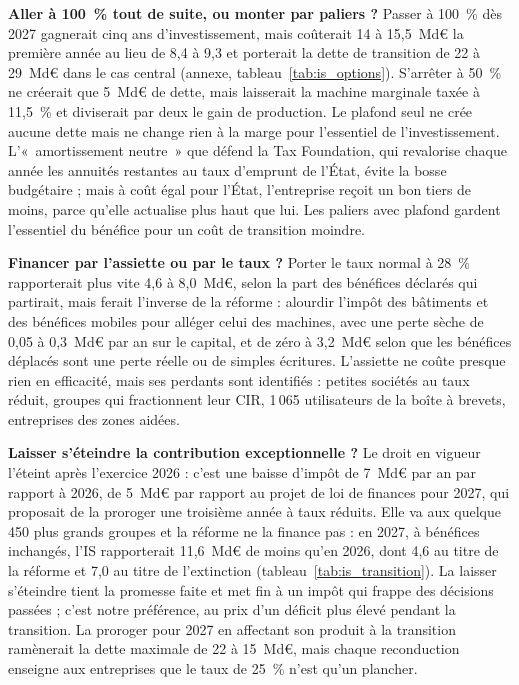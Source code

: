 \textbf{Aller à 100~\% tout de suite, ou monter par paliers ?} Passer à 100~\% dès 2027 gagnerait cinq ans
d'investissement, mais coûterait 14 à 15,5~Md€ la première année au lieu de 8,4 à 9,3 et porterait la dette de
transition de 22 à 29~Md€ dans le cas central (annexe, tableau~\ref{tab:is_options}). S'arrêter à 50~\% ne créerait que
5~Md€ de dette, mais laisserait la machine marginale taxée à 11,5~\% et diviserait par deux le gain de production. Le
plafond seul ne crée aucune dette mais ne change rien à la marge pour l'essentiel de l'investissement. L'«~amortissement
neutre~» que défend la Tax Foundation, qui revalorise chaque année les annuités restantes au taux d'emprunt de l'État,
évite la bosse budgétaire ; mais à coût égal pour l'État, l'entreprise reçoit un bon tiers de moins, parce qu'elle
actualise plus haut que lui. Les paliers avec plafond gardent l'essentiel du bénéfice pour un coût de transition
moindre.

\textbf{Financer par l'assiette ou par le taux ?} Porter le taux normal à 28~\% rapporterait plus vite 4,6 à 8,0~Md€,
selon la part des bénéfices déclarés qui partirait, mais ferait l'inverse de la réforme : alourdir l'impôt des
bâtiments et des bénéfices mobiles pour alléger celui des machines, avec une perte sèche de 0,05 à 0,3~Md€ par an sur
le capital, et de zéro à 3,2~Md€ selon que les bénéfices déplacés sont une perte réelle ou de simples écritures.
L'assiette ne coûte presque rien en efficacité, mais ses perdants sont identifiés : petites sociétés au taux réduit,
groupes qui fractionnent leur CIR, 1\,065 utilisateurs de la boîte à brevets, entreprises des zones aidées.

\textbf{Laisser s'éteindre la contribution exceptionnelle ?} Le droit en vigueur l'éteint après l'exercice 2026 : c'est
une baisse d'impôt de 7~Md€ par an par rapport à 2026, de 5~Md€ par rapport au projet de loi de finances pour 2027, qui
proposait de la proroger une troisième année à taux réduits. Elle va aux quelque 450 plus grands groupes et la réforme
ne la finance pas : en 2027, à bénéfices inchangés, l'IS rapporterait 11,6~Md€ de moins qu'en 2026, dont 4,6 au titre
de la réforme et 7,0 au titre de l'extinction (tableau~\ref{tab:is_transition}). La laisser s'éteindre tient la
promesse faite et met fin à un impôt qui frappe des décisions passées ; c'est notre préférence, au prix d'un déficit
plus élevé pendant la transition. La proroger pour 2027 en affectant son produit à la transition ramènerait la dette
maximale de 22 à 15~Md€, mais chaque reconduction enseigne aux entreprises que le taux de 25~\% n'est qu'un plancher.

